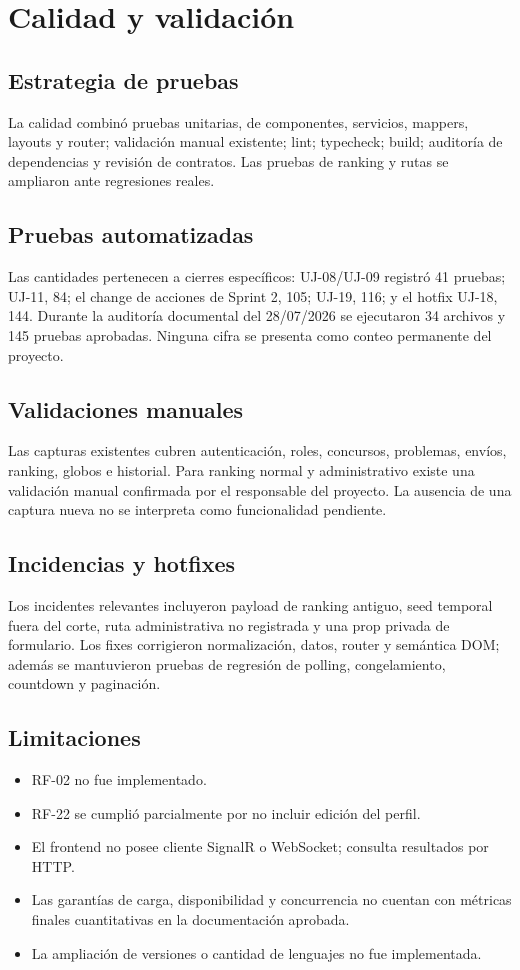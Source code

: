 \documentclass[11pt,a4paper]{article}
\begin{document}
\section{Calidad y validación}

\subsection{Estrategia de pruebas}
La calidad combinó pruebas unitarias, de componentes, servicios, mappers, layouts y router; validación manual existente; lint; typecheck; build; auditoría de dependencias y revisión de contratos. Las pruebas de ranking y rutas se ampliaron ante regresiones reales.

\subsection{Pruebas automatizadas}
Las cantidades pertenecen a cierres específicos: UJ-08/UJ-09 registró 41 pruebas; UJ-11, 84; el change de acciones de Sprint 2, 105; UJ-19, 116; y el hotfix UJ-18, 144. Durante la auditoría documental del 28/07/2026 se ejecutaron 34 archivos y 145 pruebas aprobadas. Ninguna cifra se presenta como conteo permanente del proyecto.

\subsection{Validaciones manuales}
Las capturas existentes cubren autenticación, roles, concursos, problemas, envíos, ranking, globos e historial. Para ranking normal y administrativo existe una validación manual confirmada por el responsable del proyecto. La ausencia de una captura nueva no se interpreta como funcionalidad pendiente.

\subsection{Incidencias y hotfixes}
Los incidentes relevantes incluyeron payload de ranking antiguo, seed temporal fuera del corte, ruta administrativa no registrada y una prop privada de formulario. Los fixes corrigieron normalización, datos, router y semántica DOM; además se mantuvieron pruebas de regresión de polling, congelamiento, countdown y paginación.

\subsection{Limitaciones}
\begin{itemize}
  \item RF-02 no fue implementado.
  \item RF-22 se cumplió parcialmente por no incluir edición del perfil.
  \item El frontend no posee cliente SignalR o WebSocket; consulta resultados por HTTP.
  \item Las garantías de carga, disponibilidad y concurrencia no cuentan con métricas finales cuantitativas en la documentación aprobada.
  \item La ampliación de versiones o cantidad de lenguajes no fue implementada.
\end{itemize}
\end{document}
